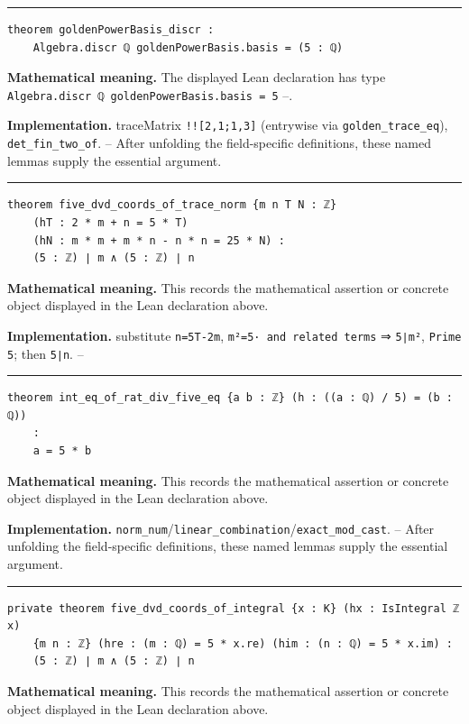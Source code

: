 \documentclass[UTF8,a4paper,11pt,fontset=fandol]{ctexart}
\theoremstyle{definition}
\newcommand{\statementsep}{\par\medskip\hrule\medskip}
\begin{document}
\statementsep
\begin{verbatim}
theorem goldenPowerBasis_discr :
    Algebra.discr ℚ goldenPowerBasis.basis = (5 : ℚ)
\end{verbatim}
\noindent\textbf{Mathematical meaning.} The displayed Lean declaration has type \texttt{Algebra.\allowbreak{}discr ℚ goldenPowerBasis.\allowbreak{}basis = 5} --.\par
\noindent\textbf{Implementation.} traceMatrix \texttt{!![2,1;1,3]} (entrywise via \texttt{golden\_\allowbreak{}trace\_\allowbreak{}eq}), \texttt{det\_\allowbreak{}fin\_\allowbreak{}two\_\allowbreak{}of}. -- After unfolding the field-specific definitions, these named lemmas supply the essential argument.\par
\statementsep
\begin{verbatim}
theorem five_dvd_coords_of_trace_norm {m n T N : ℤ}
    (hT : 2 * m + n = 5 * T)
    (hN : m * m + m * n - n * n = 25 * N) :
    (5 : ℤ) ∣ m ∧ (5 : ℤ) ∣ n
\end{verbatim}
\noindent\textbf{Mathematical meaning.} This records the mathematical assertion or concrete object displayed in the Lean declaration above.\par
\noindent\textbf{Implementation.} substitute \texttt{n=5T-2m}, \texttt{m²=5· and related terms} ⇒ \texttt{5∣m²}, \texttt{Prime 5}; then \texttt{5∣n}. --\par
\statementsep
\begin{verbatim}
theorem int_eq_of_rat_div_five_eq {a b : ℤ} (h : ((a : ℚ) / 5) = (b : ℚ))
    :
    a = 5 * b
\end{verbatim}
\noindent\textbf{Mathematical meaning.} This records the mathematical assertion or concrete object displayed in the Lean declaration above.\par
\noindent\textbf{Implementation.} \texttt{norm\_\allowbreak{}num}/\texttt{linear\_\allowbreak{}combination}/\texttt{exact\_\allowbreak{}mod\_\allowbreak{}cast}. -- After unfolding the field-specific definitions, these named lemmas supply the essential argument.\par
\statementsep
\begin{verbatim}
private theorem five_dvd_coords_of_integral {x : K} (hx : IsIntegral ℤ x)
    {m n : ℤ} (hre : (m : ℚ) = 5 * x.re) (him : (n : ℚ) = 5 * x.im) :
    (5 : ℤ) ∣ m ∧ (5 : ℤ) ∣ n
\end{verbatim}
\noindent\textbf{Mathematical meaning.} This records the mathematical assertion or concrete object displayed in the Lean declaration above.\par
\end{document}

